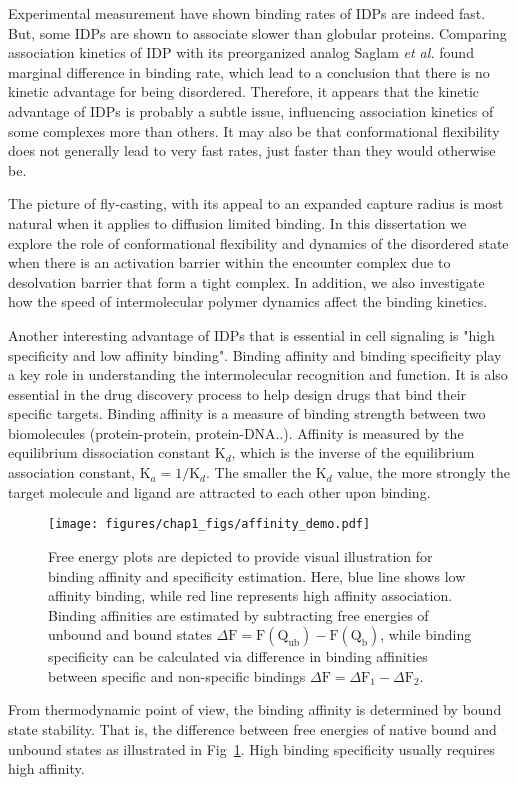 \documentclass[../talant.diss.submit.tex]{subfiles}
\begin{document}
Experimental measurement \cite{rogers:13,wright:09,shammas:13} have shown binding rates of IDPs are
indeed fast. But, some IDPs are shown to associate slower than globular proteins\cite{liu:14a}.
Comparing association kinetics of IDP with its preorganized analog Saglam \textit{et al.} found
marginal difference in binding rate, which lead to a conclusion that there is no kinetic advantage
for being disordered\cite{saglam:17f}. Therefore, it appears that the kinetic advantage of IDPs
is probably a subtle issue, influencing association kinetics of some complexes more than others.
It may also be that conformational flexibility does not generally lead to very fast rates, just faster
than they would otherwise be.

%

The picture of fly-casting, with its appeal to an expanded capture radius is most
natural when it applies to diffusion limited binding. In this dissertation we explore
the role of conformational flexibility and dynamics of the disordered state when there is
an activation barrier within the encounter complex due to desolvation barrier that form
a tight complex. In addition, we also investigate how the speed of intermolecular polymer
dynamics affect the binding kinetics.


Another interesting advantage of IDPs that is essential in cell signaling is
"high specificity and low affinity binding". Binding affinity and binding
specificity play a key role in understanding the intermolecular recognition and
function. It is also essential in the drug discovery process to help design
drugs that bind their specific targets.  Binding affinity is a measure of binding
strength between two biomolecules (protein-protein, protein-DNA..). Affinity is
measured by the equilibrium dissociation constant $\mathrm{K}_d$, which is the
inverse of the equilibrium association constant,
$\mathrm{K}_a = 1 / \mathrm{K}_d$. The smaller the $\mathrm{K}_d$ value, the
more strongly the target molecule and ligand are attracted to each other upon
binding.
%
\begin{figure}[htp!]
  \begin{centering}
    \texttt{[image: figures/chap1\_figs/affinity\_demo.pdf]}
    \caption{Free energy plots are depicted to provide visual illustration for
      binding affinity and specificity estimation. Here, blue line shows low affinity
      binding, while red line represents high affinity association. Binding affinities
      are estimated by subtracting free energies of unbound and bound states
      $\Delta \mathrm{F} = \mathrm{F(Q_{ub}) - F(Q_{b})}$, while binding specificity
      can be calculated via difference in binding affinities between specific and
      non-specific bindings $\Delta \mathrm{F} = \Delta \mathrm{F}_1 - \Delta \mathrm{F}_2$.}
    \label{fig:affinity_demo}
  \end{centering}
\end{figure}
%
%
From thermodynamic point of view, the binding affinity is determined by bound
state stability. That is, the difference between free energies of native bound
and unbound states as illustrated in Fig~\ref{fig:affinity_demo}. High
binding specificity usually requires high affinity.
\end{document}
